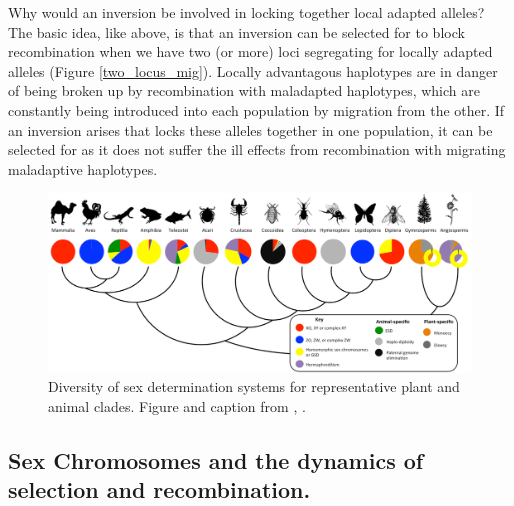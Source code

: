 Why would an inversion be involved in locking together local adapted alleles? The basic idea, like above, is that an inversion can be selected for to block recombination when we have two (or more) loci segregating for locally adapted alleles (Figure \ref{two_locus_mig}). Locally advantagous haplotypes are in danger of being broken up by recombination with maladapted haplotypes, which are constantly being
introduced into each population by migration from the other. If an inversion arises that locks these alleles together in one population, it can be selected for as it does not suffer the ill effects from recombination with migrating maladaptive haplotypes. 
 
\begin{figure} %
\begin{center}
\includegraphics[width = \textwidth]{Journal_figs/recom_selection/Sex_determ_why_so_many_ways/Tree_of_sex.png}
\end{center}
\caption{Diversity of sex determination systems for representative plant and animal clades. Figure and caption from \citet{bachtrog2014sex}, \PLOSccBY. }  \label{fig:Tree_of_sex}
\end{figure}
\subsection{Sex Chromosomes and the dynamics of selection and recombination.}

